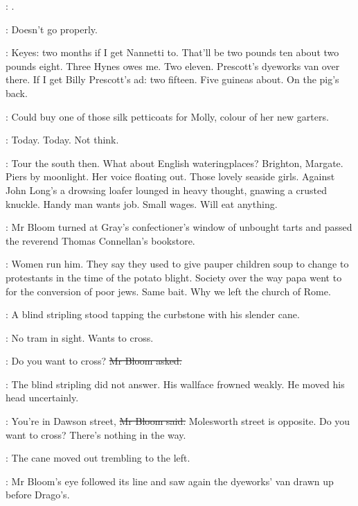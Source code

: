 \Bloom:
.


\BloomInt:
Doesn't go properly.


\BloomInt:
Keyes: two months if I get Nannetti to.
That'll be two pounds ten
about two pounds eight.
Three Hynes owes me.
Two eleven.
Prescott's dyeworks van over there.
If I get Billy Prescott's ad:
two fifteen.
Five guineas about.
On the pig's back.

\BloomInt:
Could buy one of those silk petticoats for Molly,
colour of her new garters.

\BloomInt:
Today.
Today.
Not think.

\BloomInt:
Tour the south then.
What about English wateringplaces?
Brighton, Margate.
Piers by moonlight.
Her voice floating out.
Those lovely seaside girls.
Against John Long's
a drowsing loafer lounged in heavy thought,
gnawing a crusted knuckle.
Handy man wants job.
Small wages.
Will eat anything.

:
Mr Bloom turned at Gray's confectioner's window of unbought tarts
and passed the reverend Thomas Connellan's bookstore.

\BloomInt:
Women run him.
They say they used to give pauper children soup
to change to protestants in the time of the potato blight.
Society over the way papa went to for the conversion of poor jews.
Same bait.
Why we left the church of Rome.

:
A blind stripling stood tapping the curbstone with his slender cane.

\BloomInt:
No tram in sight.
Wants to cross.

\Bloom:
Do you want to cross?
\sout{Mr Bloom asked.}

:
The blind stripling did not answer.
His wallface frowned weakly.
He moved his head uncertainly.

\Bloom:
You're in Dawson street,
\sout{Mr Bloom said.}
Molesworth street is opposite.
Do you want to cross?
There's nothing in the way.

:
The cane moved out trembling to the left.

:
Mr Bloom's eye followed its line and saw again
the dyeworks' van drawn up before Drago's.


